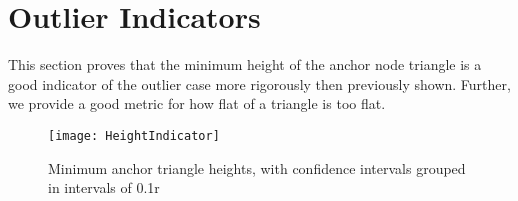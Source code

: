 \section{Outlier Indicators} 

This section proves that the minimum height of the anchor node triangle is a good indicator of the outlier case more rigorously then previously shown.  Further, we provide a good metric for how flat of a triangle is too flat.

\begin{figure}
  \centering
	\texttt{[image: HeightIndicator]}
	\caption{Minimum anchor triangle heights, with confidence intervals grouped in intervals of 0.1r}	
	\label{fig:heightIndicator}
\end{figure}


